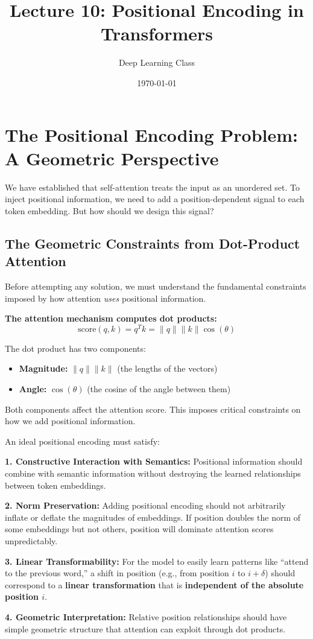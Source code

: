 \documentclass{article}
\title{Lecture 10: Positional Encoding in Transformers}
\author{Deep Learning Class}
\date{\today}
\begin{document}
    \section{The Positional Encoding Problem: A Geometric Perspective}

We have established that self-attention treats the input as an unordered set. To inject positional information, we need to add a position-dependent signal to each token embedding. But how should we design this signal?

\subsection{The Geometric Constraints from Dot-Product Attention}

Before attempting any solution, we must understand the fundamental constraints imposed by how attention \textit{uses} positional information.

\textbf{The attention mechanism computes dot products:}
\[
\text{score}(q, k) = q^T k = \|q\| \|k\| \cos(\theta)
\]

The dot product has two components:
\begin{itemize}
\item \textbf{Magnitude:} $\|q\| \|k\|$ (the lengths of the vectors)
\item \textbf{Angle:} $\cos(\theta)$ (the cosine of the angle between them)
\end{itemize}

Both components affect the attention score. This imposes critical constraints on how we add positional information.

\begin{tcolorbox}[colback=yellow!5!white, colframe=orange!50!black, title=The Core Design Constraints]
An ideal positional encoding must satisfy:

\textbf{1. Constructive Interaction with Semantics:} Positional information should combine with semantic information without destroying the learned relationships between token embeddings.

\textbf{2. Norm Preservation:} Adding positional encoding should not arbitrarily inflate or deflate the magnitudes of embeddings. If position doubles the norm of some embeddings but not others, position will dominate attention scores unpredictably.

\textbf{3. Linear Transformability:} For the model to easily learn patterns like ``attend to the previous word,'' a shift in position (e.g., from position $i$ to $i+\delta$) should correspond to a \textbf{linear transformation} that is \textbf{independent of the absolute position $i$}.

\textbf{4. Geometric Interpretation:} Relative position relationships should have simple geometric structure that attention can exploit through dot products.
\end{tcolorbox}
\end{document}
